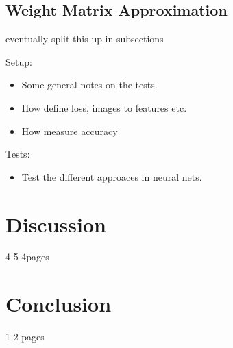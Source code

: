 \documentclass[doctype=mastersthesis,BCOR=15mm,biblatex]{ldvbook}%
\begin{document}
\section{Weight Matrix Approximation}
eventually split this up in subsections

Setup: 
\begin{itemize}
	\item Some general notes on the tests.
	\item How define loss, images to features etc. 
	\item How measure accuracy
\end{itemize}

Tests:
\begin{itemize}
\item Test the different approaces in neural nets.
\end{itemize}
\chapter{Discussion}
4-5 4pages

\chapter{Conclusion}
1-2 pages



\the\textwidth



\printbibliography{}
\end{document}
